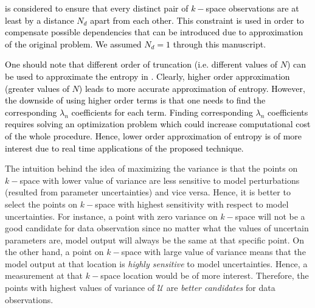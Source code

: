 \documentclass{article}         %
\theoremstyle{definition}
\theoremstyle{remark}
\begin{document}
\textcolor{black}{ is considered to ensure that every distinct pair of $k-$space observations are at least by a distance $N_d$ apart from each other. This constraint is used in order to compensate possible dependencies that can be introduced due to approximation of the original problem. We assumed $N_d=1$ through this manuscript.}

\textcolor{black}{One should note that different order of truncation (i.e. different values of $N$) can be used to approximate the entropy in . Clearly, higher order approximation (greater values of $N$) leads to more accurate approximation of entropy. However, the downside of using higher order terms is that one needs to find the corresponding $\lambda_n$ coefficients for each term. Finding corresponding $\lambda_n$ coefficients requires solving an optimization problem which could increase computational cost of the whole procedure. Hence, lower order approximation of entropy is of more interest due to real time applications of the proposed technique.}

%
The intuition behind the idea of maximizing the variance is that the points on $k-$space with lower value of variance are less sensitive to model perturbations (resulted from parameter uncertainties) and vice versa. Hence, it is better to select the points on $k-$space with highest sensitivity with respect to model uncertainties. For instance, a point with zero variance on $k-$space will not be a good candidate for data observation since no matter what the values of uncertain parameters are, model output will always be the same at that specific point. On the other hand, a point on $k-$space with large value of variance means that the model output at that location is \textit{highly sensitive} to model uncertainties. Hence, a measurement at that $k-$space location would be of more interest. Therefore, the points with highest values of variance of $\mathcal{U}$ are \textit{better candidates} for data observations. 
\end{document}
